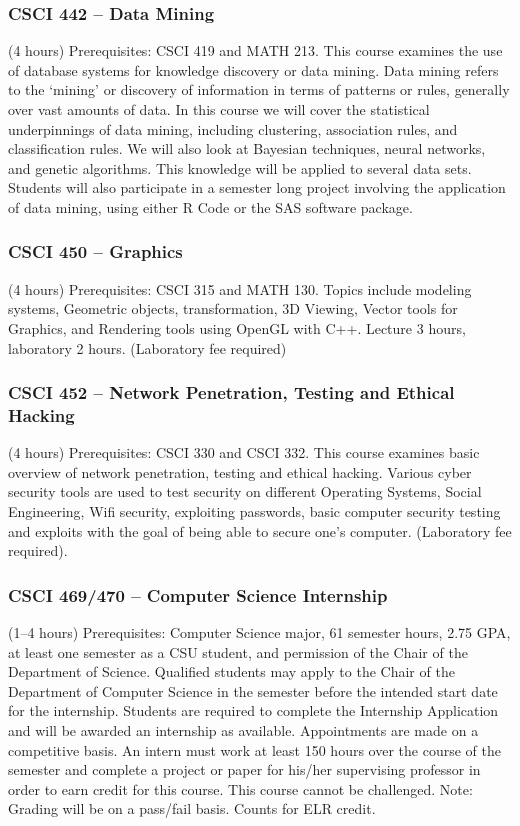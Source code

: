 \subsubsection{CSCI 442 -- Data Mining}
(4 hours) Prerequisites: CSCI 419 and MATH 213. This course examines the use of database systems for knowledge discovery or data mining. Data mining refers to the ‘mining’ or discovery of information in terms of patterns or rules, generally over vast amounts of data. In this course we will cover the statistical underpinnings of data mining, including clustering, association rules, and classification rules. We will also look at Bayesian techniques, neural networks, and genetic algorithms. This knowledge will be applied to several data sets. Students will also participate in a semester long project involving the application of data mining, using either R Code or the SAS software package.

\subsubsection{CSCI 450 -- Graphics}
(4 hours) Prerequisites: CSCI 315 and MATH 130. Topics include modeling systems, Geometric objects, transformation, 3D Viewing, Vector tools for Graphics, and Rendering tools using OpenGL with C++. Lecture 3 hours, laboratory 2 hours. (Laboratory fee required)

\subsubsection{CSCI 452 -- Network Penetration, Testing and Ethical Hacking}
(4 hours) Prerequisites: CSCI 330 and CSCI 332. This course examines basic overview of network penetration, testing and ethical hacking. Various cyber security tools are used to test security on different Operating Systems, Social Engineering, Wifi security, exploiting passwords, basic computer security testing and exploits with the goal of being able to secure one's computer. (Laboratory fee required).

\subsubsection{CSCI 469/470 -- Computer Science Internship}
(1--4 hours) Prerequisites: Computer Science major, 61 semester hours, 2.75 GPA, at least one semester as a CSU student, and permission of the Chair of the Department of Science. Qualified students may apply to the Chair of the Department of Computer Science in the semester before the intended start date for the internship. Students are required to complete the Internship Application and will be awarded an internship as available. Appointments are made on a competitive basis. An intern must work at least 150 hours over the course of the semester and complete a project or paper for his/her supervising professor in order to earn credit for this course. This course cannot be challenged. Note: Grading will be on a pass/fail basis. Counts for ELR credit.

